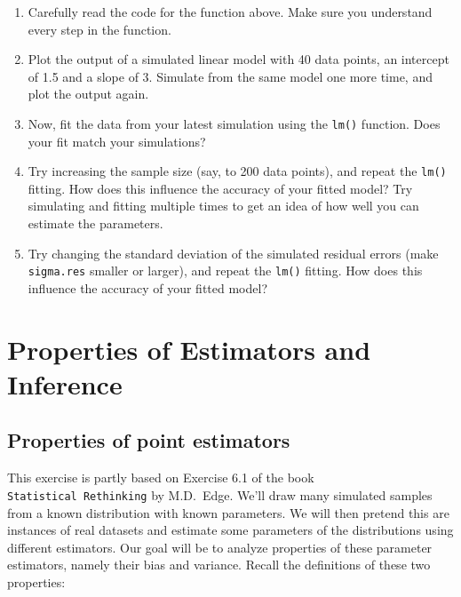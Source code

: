 \documentclass[
]{book}
\providecommand{\tightlist}{%
  \setlength{\itemsep}{0pt}\setlength{\parskip}{0pt}}
\begin{document}
\begin{enumerate}
\def\labelenumi{\alph{enumi})}
\tightlist
\item
  Carefully read the code for the function above. Make sure you understand every step in the function.\\
\item
  Plot the output of a simulated linear model with 40 data points, an intercept of 1.5 and a slope of 3. Simulate from the same model one more time, and plot the output again.\\
\item
  Now, fit the data from your latest simulation using the \texttt{lm()} function. Does your fit match your simulations?\\
\item
  Try increasing the sample size (say, to 200 data points), and repeat the \texttt{lm()} fitting. How does this influence the accuracy of your fitted model? Try simulating and fitting multiple times to get an idea of how well you can estimate the parameters.\\
\item
  Try changing the standard deviation of the simulated residual errors (make \texttt{sigma.res} smaller or larger), and repeat the \texttt{lm()} fitting. How does this influence the accuracy of your fitted model?
\end{enumerate}

\hypertarget{properties-of-estimators-and-inference}{%
\chapter{Properties of Estimators and Inference}\label{properties-of-estimators-and-inference}}

\hypertarget{properties-of-point-estimators}{%
\section{Properties of point estimators}\label{properties-of-point-estimators}}

This exercise is partly based on Exercise 6.1 of the book \texttt{Statistical\ Rethinking} by M.D.~Edge. We'll draw many simulated samples from a known distribution with known parameters. We will then pretend this are instances of real datasets and estimate some parameters of the distributions using different estimators. Our goal will be to analyze properties of these parameter estimators, namely their bias and variance. Recall the definitions of these two properties:
\end{document}
